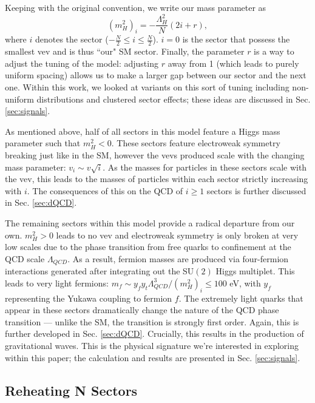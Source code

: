 \documentclass[nofootinbib,twocolumn,preprintnumbers]{revtex4-2}
\begin{document}
Keeping with the original convention, we write our mass parameter as
\begin{equation}\label{eqn:massParam}
\left(m_H^2\right)_i = -\frac{\Lambda_H^2}{N}(2i+r),
\end{equation}
where $i$ denotes the sector ($-\frac{N}{2}\leq i \leq \frac{N}{2}$). $i = 0$ is the sector that possess the smallest vev and is thus ``our" SM sector. Finally, the parameter $r$ is a way to adjust the tuning of the model: adjusting $r$ away from 1 (which leads to purely uniform spacing) allows us to make a larger gap between our sector and the next one. Within this work, we looked at variants on this sort of tuning including non-uniform distributions and clustered sector effects; these ideas are discussed in Sec. \ref{sec:signals}.   

As mentioned above, half of all sectors in this model feature a Higgs mass parameter such that $m_H^2 < 0$. These sectors feature electroweak symmetry breaking just like in the SM, however the vevs produced scale with the changing mass parameter: $v_i \sim v\sqrt{i}$. As the masses for particles in these sectors scale with the vev, this leads to the masses of particles within each sector strictly increasing with $i$. The consequences of this on the QCD of $i \geq 1$ sectors is further discussed in Sec. \ref{sec:dQCD}. 

The remaining sectors within this model provide a radical departure from our own. $m_H^2 > 0$ leads to no vev and electroweak symmetry is only broken at very low scales due to the phase transition from free quarks to confinement at the QCD scale $\Lambda_{QCD}$. As a result, fermion masses are produced via four-fermion interactions generated after integrating out the SU$(2)$ Higgs multiplet. This leads to very light fermions: $m_f \sim y_f y_t \Lambda_{QCD}^3/(m^2_H)_i \leq 100$ eV, with $y_f$ representing the Yukawa coupling to fermion $f$. The extremely light quarks that appear in these sectors dramatically change the nature of the QCD phase transition --- unlike the SM, the transition is strongly first order. Again, this is further developed in Sec. \ref{sec:dQCD}. Crucially, this results in the production of gravitational waves. This is the physical signature we're interested in exploring within this paper; the calculation and results are presented in Sec. \ref{sec:signals}. 

\subsection{Reheating N Sectors}
\end{document}
